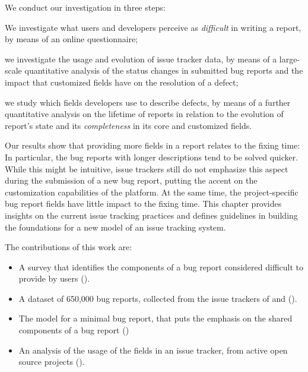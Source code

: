 
We conduct our investigation in three steps: \begin{inparaenum}[(1)]
\item We investigate what users and developers perceive as \emph{difficult} in writing a report, by means of an online questionnaire;
\item we investigate the usage and evolution of issue tracker data, by means of a large-scale quantitative analysis of the status changes in submitted bug reports and the impact that customized fields have on the resolution of a defect;
\item we study which fields developers use to describe defects, by means of a further quantitative analysis on the lifetime of reports in relation to the evolution of report's state and its \emph{completeness} in its core and customized fields.
\end{inparaenum}

Our results show that providing more fields in a report relates to the fixing time: In particular, the bug reports with longer descriptions tend to be solved quicker.
While this might be intuitive, issue trackers still do not emphasize this aspect during the submission of a new bug report, putting the accent on the customization capabilities of the platform.
At the same time, the project-specific bug report fields have little impact to the fixing time.
This chapter provides insights on the current issue tracking practices and defines guidelines in building the foundations for a new model of an issue tracking system.

The contributions of this work are:

\begin{itemize}[$\circ$]

\item A survey that identifies the components of a bug report considered difficult to provide by users ().

\item A dataset of 650,000 bug reports, collected from the issue trackers of \bzilla and \jira ().

\item The model for a minimal bug report, that puts the emphasis on the shared components of a bug report ()

\item An analysis of the usage of the fields in an issue tracker, from active open source projects ().

\end{itemize}




